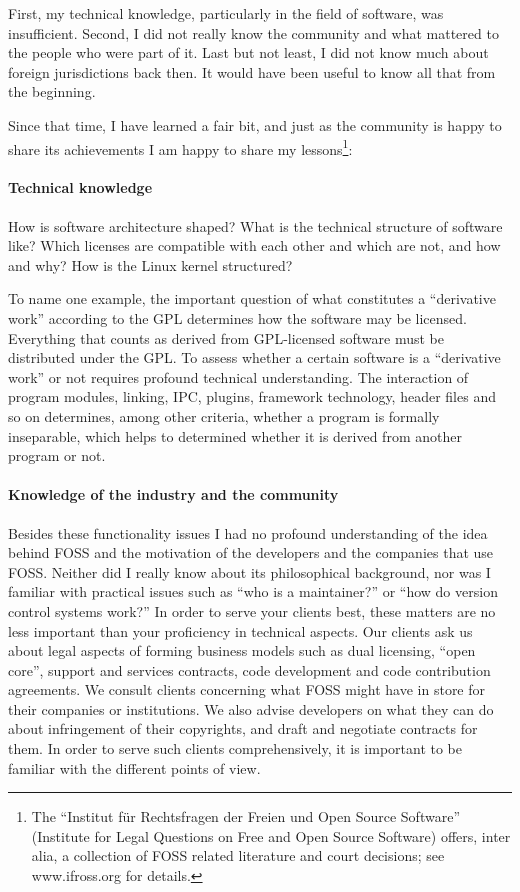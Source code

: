 First, my technical knowledge, particularly in the field of software, was
insufficient. Second, I did not really know the community and what mattered to
the people who were part of it. Last but not least, I did not know much about
foreign jurisdictions back then. It would have been useful to know all that from
the beginning.

Since that time, I have learned a fair bit, and just as the community is happy
to share its achievements I am happy to share my lessons\footnote{The ``Institut
f\"ur Rechtsfragen der Freien und Open Source Software'' (Institute for Legal
Questions on Free and Open Source Software) offers, inter alia, a collection of
FOSS related literature and court decisions; see www.ifross.org for details.}:

\paragraph*{Technical knowledge}
How is software architecture shaped? What is the technical structure of software
like? Which licenses are compatible with each other and which are not, and how
and why? How is the Linux kernel structured? 

To name one example, the important question of what constitutes a ``derivative
work'' according to the GPL determines how the software may be licensed.
Everything that counts as derived from GPL-licensed software must be distributed
under the GPL. To assess whether a certain software is a ``derivative work'' or
not requires profound technical understanding. The interaction of program
modules, linking, IPC, plugins, framework technology, header files and so on
determines, among other criteria, whether a program is formally inseparable,
which helps to determined whether it is derived from another program or not. 

\paragraph*{Knowledge of the industry and the community}
Besides these functionality issues I had no profound understanding of the idea
behind FOSS and the motivation of the developers and the companies that use
FOSS. Neither did I really know about its philosophical background, nor was I
familiar with practical issues such as ``who is a maintainer?'' or ``how do version control systems work?'' In order to serve your clients best, these matters are no less important than your proficiency in technical aspects.  
Our clients ask us about legal aspects of forming business models such as dual
licensing, ``open core'', support and services contracts, code development and
code contribution agreements. We consult clients concerning what FOSS might have
in store for their companies or institutions. We also advise developers on what
they can do about infringement of their copyrights, and draft and negotiate
contracts for them. In order to serve such clients comprehensively, it is
important to be familiar with the different points of view.  

